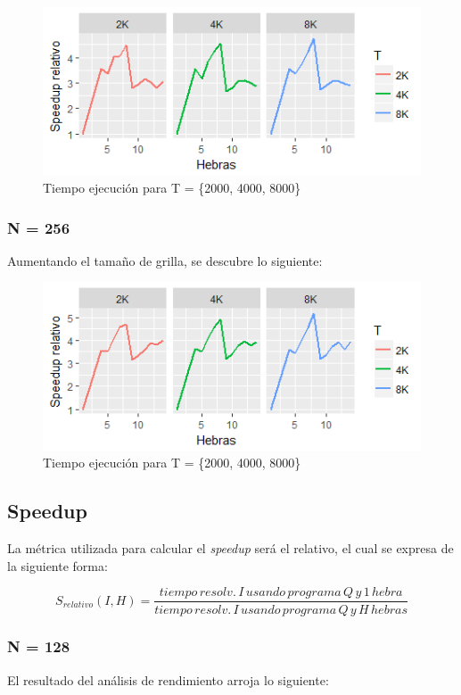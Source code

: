 \documentclass[jou]{apa6}
\begin{document}
\begin{figure}[h]
	\includegraphics[width=\columnwidth]{srel-128px.png}
	\caption{Tiempo ejecución para T = \{2000, 4000, 8000\}}
	\label{fig:Figure1}
\end{figure}

\subsubsection{N = 256}
Aumentando el tamaño de grilla, se descubre lo siguiente:

\begin{figure}[h]
	\includegraphics[width=\columnwidth]{srel-256px.png}
	\caption{Tiempo ejecución para T = \{2000, 4000, 8000\}}
	\label{fig:Figure2}
\end{figure}

\subsection{Speedup}
La métrica utilizada para calcular el \textit{speedup} será el relativo, el cual se expresa de la siguiente forma:

\[
	S_{relativo}(I, H) = \frac{tiempo\, resolv.\, I\, usando\, programa\, Q\, y\, 1\, hebra}{tiempo\, resolv.\, I\, usando\, programa\, Q\, y\, H\, hebras}
\]

\subsubsection{N = 128}
El resultado del análisis de rendimiento arroja lo siguiente:
\end{document}
